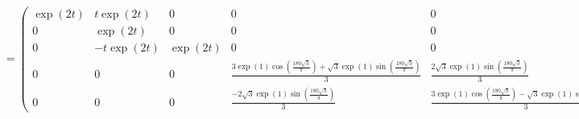 \begin{solution}
\begin{align*}
  &= \begin{pmatrix}
    \exp(2t) & t\exp(2t) & 0 & 0 & 0 \\
    0 & \exp(2t) & 0 & 0 & 0 \\
    0 & -t\exp(2t) & \exp(2t) & 0 & 0 \\
    0 & 0 & 0 &
    \frac{3\exp(1)\cos(\frac{180\sqrt{3}}{\pi})+\sqrt{3}\exp(1)\sin(\frac{180\sqrt
    {3}}{\pi})}{3} & \frac{2\sqrt{3}\exp(1)\sin(\frac{180\sqrt{3}}{\pi})}{3}
    \\
    0 & 0 & 0 & \frac{-2\sqrt{3}\exp(1)\sin(\frac{180\sqrt{3}}{\pi})}{3} &
    \frac{3\exp(1)\cos(\frac{180\sqrt{3}}{\pi})-
    \sqrt{3}\exp(1)\sin(\frac{180\sqrt{3}}{\pi})}{3}
  \end{pmatrix}
\end{align*}
\end{solution}
